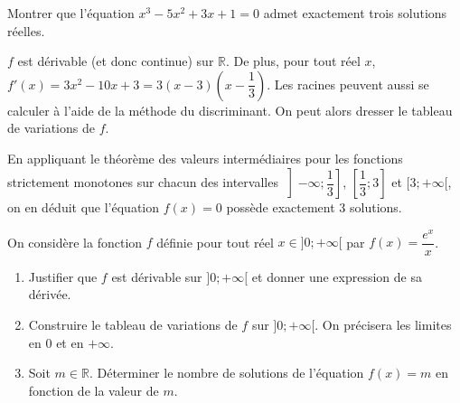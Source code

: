 \documentclass[11pt,fleqn, openany]{book} %
\begin{document}
\begin{exercise}Montrer que l'équation $x^3-5x^2+3x+1=0$ admet exactement trois solutions réelles.\end{exercise}

\begin{solution} $f$ est dérivable (et donc continue) sur $\mathbb{R}$. De plus, pour tout réel $x$, $f'(x)=3x^2-10x+3=3(x-3)\left(x-\dfrac{1}{3}\right)$. Les racines peuvent aussi se calculer à l'aide de la méthode du discriminant. On peut alors dresser le tableau de variations de $f$.

\begin{center}
\end{center}

En appliquant le théorème des valeurs intermédiaires pour les fonctions strictement monotones sur chacun des intervalles $\left]-\infty ; \dfrac{1}{3}\right ]$, $\left[ \dfrac{1}{3}; 3 \right]$ et $[3;+\infty [$, on en déduit que l'équation $f(x)=0$ possède exactement 3 solutions.\end{solution}




\begin{exercise}[topic=cont03, subtitle={(Métropole 2021)}]

On considère la fonction $f$ définie pour tout réel $x\in ]0;+\infty[$ par $f(x)=\dfrac{e^x}{x}$. 
\begin{enumerate}
\item Justifier que $f$ est dérivable sur $]0;+\infty[$ et donner une expression de sa dérivée.
\item Construire le tableau de variations de $f$ sur $]0;+\infty[$. On précisera les limites en $0$ et en $+\infty$.
\item Soit $m\in\mathbb{R}$. Déterminer le nombre de solutions de l'équation $f(x)=m$ en fonction de la valeur de $m$.
\end{enumerate}
\end{exercise}
\end{document}
